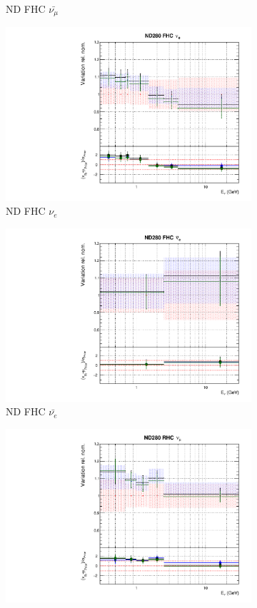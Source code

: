 \begin{figure}
\begin{subfigure}{0.24\textwidth}
  \caption{ND FHC $\bar{\nu_{\mu}}$}
\end{subfigure}
\begin{subfigure}{0.24\textwidth}
  \centering
  \includegraphics[width=0.95\linewidth]{figs/polyasmvsflux_2}
  \caption{ND FHC $\nu_{e}$}
\end{subfigure}
\begin{subfigure}{0.24\textwidth}
  \centering
  \includegraphics[width=0.95\linewidth]{figs/polyasmvsflux_3}
  \caption{ND FHC $\bar{\nu_{e}}$}
\end{subfigure}
\begin{subfigure}{0.24\textwidth}
  \centering
  \includegraphics[width=0.95\linewidth]{figs/polyasmvsflux_4}

\end{subfigure}
\end{figure}
